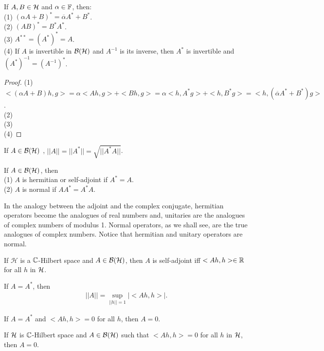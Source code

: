 \begin{proposition}{}{}
    If $A,B\in \mathcal{\mathcal{H}}$ and $\alpha\in\mathbb{F}$, then:\\
    (1) $(\alpha A+B)^*=\overline{\alpha}A^*+B^*$.\\
    (2) $(AB)^*=B^*A^*$.\\
    (3) $A^{**}=(A^*)^*=A$.\\
    (4) If $A$ is invertible in $\mathcal{B}(\mathcal{H})$ and $A^{-1}$ is its inverse, then $A^*$ is invertible and $(A^*)^{-1} = (A^{-1})^*$.
\end{proposition}
\begin{proof}
    (1) $<(\alpha A+B)h,g>=\alpha <Ah,g> + <Bh,g> = \alpha<h,A^*g> + <h,B^*g>=<h,(\overline{\alpha}A^*+B^*)g>$.
    \\
    (2)\\
(3)\\
(4)
\end{proof}

\begin{proposition}{}{}
    If $A\in \mathcal{B}(\mathcal{H})$ , $||A||=||A^*||=\sqrt{||A^*A||}$.
\end{proposition}

\begin{definition}
    If $A\in \mathcal{B}(\mathcal{H})$, then\\
    (1) $A$ is hermitian or self-adjoint if $A^*=A$.\\
    (2) $A$ is normal if $AA^*=A^*A$.
\end{definition}

In the analogy between the adjoint and the complex conjugate, hermitian 
operators become the analogues of real numbers and, unitaries are 
the analogues of complex numbers of modulus 1. Normal operators, as we 
shall see, are the true analogues of complex numbers. Notice that hermitian 
and unitary operators are normal.

\begin{proposition}{}{}
    If $\mathcal{H}$ is a $\mathbb{C}$-Hilbert space and $A\in \mathcal{B}(\mathcal{H})$, then $A$ is self-adjoint iff
    $<Ah,h>\in\mathbb{R}$ for all $h$ in $\mathcal{H}$. 
\end{proposition}

\begin{proposition}{}{}
    If $A=A^*$, then 
    \begin{align*}
        ||A||=\sup_{||h||=1}|<Ah,h>|. 
    \end{align*}
\end{proposition}

\begin{corollary}{}{}
    If $A=A^*$ and $<Ah,h>=0$ for all $h$, then $A=0$.
\end{corollary}

\begin{proposition}{}{}
    If $\mathcal{H}$ is $\mathbb{C}$-Hilbert space and $A\in \mathcal{B}(\mathcal{H})$ such that $<Ah,h>=0$ for all $h$ in $\mathcal{H}$, then $A=0$.
\end{proposition}

